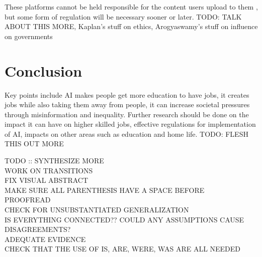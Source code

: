 \documentclass[12pt, man]{apa6}
\begin{document}
These platforms cannot be held responsible for the content users upload to them \parencite{Arogyaswamy2020}, but some form of regulation will be necessary sooner or later.  TODO: TALK ABOUT THIS MORE, Kaplan's stuff on ethics, Arogyaswamy's stuff on influence on governments

\section{Conclusion}
Key points include AI makes people get more education to have jobs, it creates jobs while also taking them away from people, it can increase societal pressures through misinformation and inequality.  Further research should be done on the impact it can have on higher skilled jobs, effective regulations for implementation of AI, impacts on other areas such as education and home life.  TODO: FLESH THIS OUT MORE

TODO :: SYNTHESIZE MORE\\
WORK ON TRANSITIONS\\
FIX VISUAL ABSTRACT\\
MAKE SURE ALL PARENTHESIS HAVE A SPACE BEFORE\\
PROOFREAD\\
CHECK FOR UNSUBSTANTIATED GENERALIZATION\\
IS EVERYTHING CONNECTED?? COULD ANY ASSUMPTIONS CAUSE DISAGREEMENTS?\\
ADEQUATE EVIDENCE\\
CHECK THAT THE USE OF IS, ARE, WERE, WAS ARE ALL NEEDED\\






\printbibliography
\end{document}
